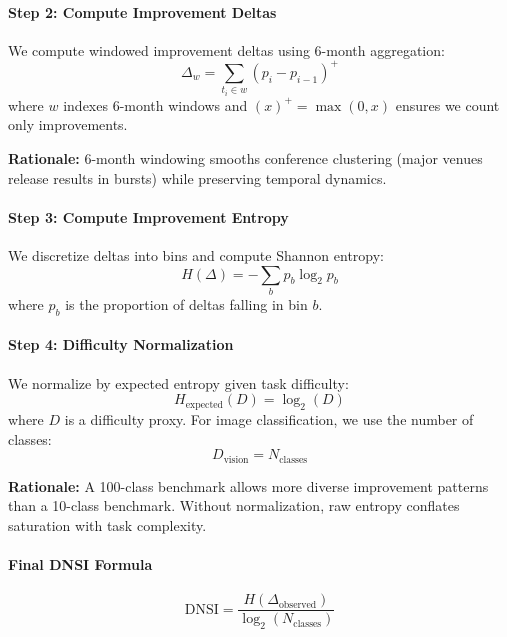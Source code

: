 \paragraph{Step 2: Compute Improvement Deltas}
We compute windowed improvement deltas using 6-month aggregation:
\begin{equation}
\Delta_w = \sum_{t_i \in w} (p_i - p_{i-1})^+
\end{equation}
where $w$ indexes 6-month windows and $(x)^+ = \max(0, x)$ ensures we count only improvements.

\textbf{Rationale:} 6-month windowing smooths conference clustering (major venues release results in bursts) while preserving temporal dynamics.

\paragraph{Step 3: Compute Improvement Entropy}
We discretize deltas into bins and compute Shannon entropy:
\begin{equation}
H(\Delta) = -\sum_{b} p_b \log_2 p_b
\end{equation}
where $p_b$ is the proportion of deltas falling in bin $b$.

\paragraph{Step 4: Difficulty Normalization}
We normalize by expected entropy given task difficulty:
\begin{equation}
H_{\text{expected}}(D) = \log_2(D)
\end{equation}
where $D$ is a difficulty proxy. For image classification, we use the number of classes:
\begin{equation}
D_{\text{vision}} = N_{\text{classes}}
\end{equation}

\textbf{Rationale:} A 100-class benchmark allows more diverse improvement patterns than a 10-class benchmark. Without normalization, raw entropy conflates saturation with task complexity.

\paragraph{Final DNSI Formula}
\begin{equation}
\text{DNSI} = \frac{H(\Delta_{\text{observed}})}{\log_2(N_{\text{classes}})}
\end{equation}

